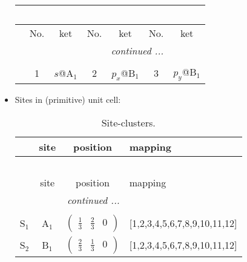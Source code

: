 \documentclass[fleqn,10pt,landscape]{article}
\begin{document}
\begin{itemize}
\begin{center}
\begin{longtable}{c|cc|cc|cc}
\multicolumn{6}{l}{\tablename\ \thetable{}} \\
 \hline \hline
 & No. & ket & No. & ket & No. & ket \\ \hline \endhead

 \hline \hline
\multicolumn{6}{r}{\footnotesize\it continued ...} \\ \endfoot

 \hline \hline
\multicolumn{6}{r}{} \\ \endlastfoot

 & 1 & $s$@A$_{1}$ & 2 & $p_{x}$@B$_{1}$ & 3 & $p_{y}$@B$_{1}$ \\
\end{longtable}
\end{center}

\item Sites in (primitive) unit cell:
\begin{center}
\renewcommand{\arraystretch}{1.3}
\begin{longtable}{cc|c|l}
\caption{Site-clusters.}
 \\
 \hline \hline
 & site & position & mapping \\ \hline \endfirsthead

\multicolumn{3}{l}{\tablename\ \thetable{}} \\
 \hline \hline
 & site & position & mapping \\ \hline \endhead

 \hline \hline
\multicolumn{3}{r}{\footnotesize\it continued ...} \\ \endfoot

 \hline \hline
\multicolumn{3}{r}{} \\ \endlastfoot

S$_{1}$ & A$_1$ & $\begin{pmatrix} \frac{1}{3} & \frac{2}{3} & 0 \end{pmatrix}$ & [1,2,3,4,5,6,7,8,9,10,11,12] \\ \hline
S$_{2}$ & B$_1$ & $\begin{pmatrix} \frac{2}{3} & \frac{1}{3} & 0 \end{pmatrix}$ & [1,2,3,4,5,6,7,8,9,10,11,12] \\
\end{longtable}
\end{center}


\end{itemize}
\end{document}
